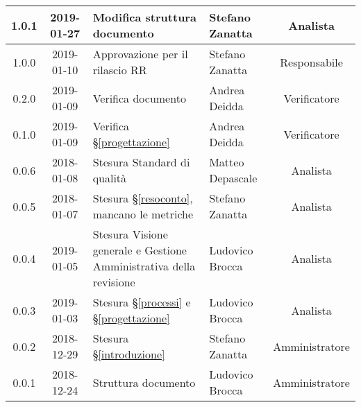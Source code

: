 \begin{center}
\begin{tabularx}{\textwidth}{|c|c|X|X|c|}
			\hline
			1.0.1 & 2019-01-27 & Modifica struttura documento & Stefano Zanatta & Analista\\
			\hline
			1.0.0 & 2019-01-10 & Approvazione per il rilascio RR & Stefano Zanatta & Responsabile\\
			\hline
			0.2.0 & 2019-01-09 & Verifica documento & Andrea Deidda & Verificatore\\
			\hline
			0.1.0 & 2019-01-09 & Verifica \S\ref{progettazione} & Andrea Deidda & Verificatore\\
			\hline
			0.0.6 & 2018-01-08 & Stesura Standard di qualità & Matteo Depascale & Analista\\
			\hline
			0.0.5 & 2018-01-07 & Stesura \S\ref{resoconto}, mancano le metriche & Stefano Zanatta & Analista\\
			\hline
			0.0.4 & 2019-01-05 & Stesura Visione generale e Gestione Amministrativa della revisione  & Ludovico Brocca& Analista\\
			\hline
			0.0.3 & 2019-01-03& Stesura \S\ref{processi} e \S\ref{progettazione} &Ludovico Brocca & Analista\\
			\hline
			0.0.2 & 2018-12-29 & Stesura \S\ref{introduzione} & Stefano Zanatta & Amministratore\\
			\hline
			0.0.1 & 2018-12-24 & Struttura documento & Ludovico Brocca & Amministratore\\
			\hline
		\end{tabularx}
	\end{center}
\newpage
